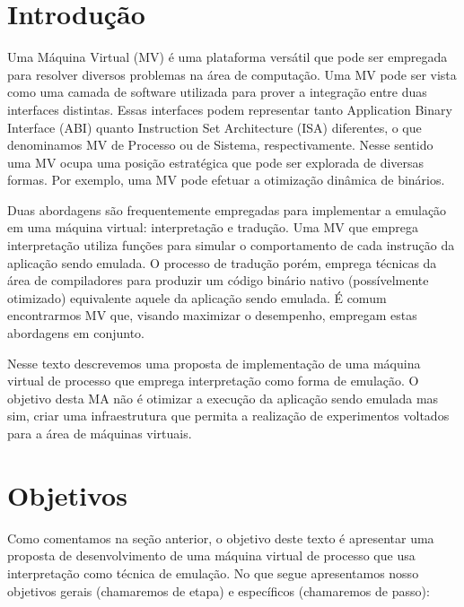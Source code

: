 \documentclass[11pt,twoside]{article}
\begin{document}
\section{Introdução}

Uma Máquina Virtual (MV) é uma plataforma versátil que pode ser empregada 
para resolver diversos problemas na área de computação. Uma MV pode ser 
vista como uma camada de software utilizada para prover a integração
entre duas interfaces distintas. Essas interfaces podem representar tanto
Application Binary Interface (ABI) quanto Instruction Set Architecture (ISA) 
diferentes, o que denominamos MV de Processo ou de Sistema, respectivamente. 
Nesse sentido uma MV ocupa uma posição estratégica que pode ser explorada de 
diversas formas. Por exemplo, uma MV pode efetuar a otimização dinâmica de 
binários.

Duas abordagens são frequentemente empregadas para implementar a emulação
em uma máquina virtual: interpretação e tradução. Uma MV que emprega 
interpretação utiliza funções para simular o comportamento de cada instrução
da aplicação sendo emulada. O processo de tradução porém, emprega técnicas
da área de compiladores para produzir um código binário nativo (possívelmente
otimizado) equivalente aquele da aplicação sendo emulada. É comum encontrarmos 
MV que, visando maximizar o desempenho, empregam estas abordagens em conjunto.

Nesse texto descrevemos uma proposta de implementação de uma máquina virtual
de processo que emprega interpretação como forma de emulação. O objetivo desta
MA não é otimizar a execução da aplicação sendo emulada mas sim, criar uma
infraestrutura que permita a realização de experimentos voltados para a área
de máquinas virtuais.
   
\section{Objetivos}
% 

Como comentamos na seção anterior, o objetivo deste texto é apresentar
uma proposta de desenvolvimento de uma máquina virtual de processo que
usa interpretação como técnica de emulação. No que segue apresentamos
nosso objetivos gerais (chamaremos de etapa) e específicos (chamaremos
de passo):
\end{document}
